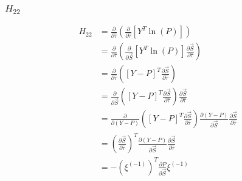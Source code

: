 \documentclass{article}
\begin{document}
\subsubsection{$H_{22}$}
\begin{equation}
\begin{aligned}
H_{22} &= \frac{\partial}{\partial \hat{\tau}}  \left( \frac{\partial}{\partial \hat{\tau}}  \left[ Y^T \ln \left( P \right) \right] \right) 
\\
&= \frac{\partial}{\partial \hat{\tau}}  \left( \frac{\partial}{\partial \vec{S}}  \left[ Y^T \ln \left( P \right) \right] \frac{\partial \vec{S}}{\partial \hat{\tau}} \right)
\\
&= \frac{\partial}{\partial \hat{\tau}}  \left( \left[ Y - P \right]^T \frac{\partial \vec{S}}{\partial \hat{\tau}} \right) 
\\
&= \frac{\partial}{\partial \vec{S}}  \left( \left[ Y - P \right]^T \frac{\partial \vec{S}}{\partial \hat{\tau}} \right) \frac{\partial \vec{S}}{\partial \hat{\tau}} 
\\
&= \frac{\partial}{\partial \left( Y - P \right)}  \left( \left[ Y - P \right]^T \frac{\partial \vec{S}}{\partial \hat{\tau}} \right) \frac{\partial \left( Y - P \right)}{\partial \vec{S}} \frac{\partial \vec{S}}{\partial \hat{\tau}} 
\\
&= \left( \frac{\partial \vec{S}}{\partial \hat{\tau}} \right)^T \frac{\partial \left( Y - P \right)}{\partial \vec{S}} \frac{\partial \vec{S}}{\partial \hat{\tau}} 
\\
&= - \left( \xi^{(-1)} \right)^T \frac{\partial P}{\partial \vec{S}} \xi^{(-1)}
\end{aligned}
\end{equation}
\end{document}
